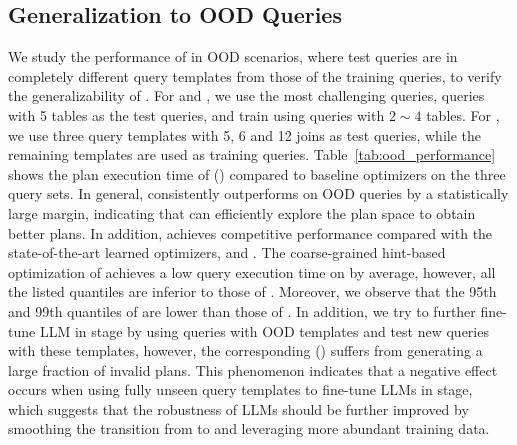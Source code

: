 \subsection{Generalization to OOD Queries}
\label{sec:exp:generalization}
We study the performance of \LLMQO in OOD scenarios, where test queries are in completely different query templates from those of the training queries, to verify the generalizability of \LLMQO.
For \imdb and \job, we use the most challenging queries, queries with 5 tables as the test queries, and train \LLMQO using queries with $2\sim 4$ tables.
For \dsb, we use three query templates with 5, 6 and 12 joins as test queries, while the remaining templates are used as training queries. 
Table~\ref{tab:ood_performance} shows the plan execution time of \LLMQO (\QIT) compared to baseline optimizers on the three query sets. 
In general, \LLMQO consistently outperforms \Postgres on OOD queries by a statistically large margin, 
indicating that \LLMQO can efficiently explore the plan space to obtain better plans.
In addition, \LLMQO achieves competitive performance compared with the state-of-the-art learned optimizers, \bao and \hybrid.
The coarse-grained hint-based optimization of \bao achieves a low query execution time on \dsb 
by average, however, all the listed quantiles are inferior to those of \LLMQO. Moreover, we observe that the 95th and 99th quantiles of \hybrid are lower than those of \LLMQO.
In addition, we try to further fine-tune LLM in \QDPO stage by using queries with OOD templates and test new queries with these templates, however, the corresponding \LLMQO (\QDPO) suffers from generating a large fraction of invalid plans. 
This phenomenon indicates that a
negative effect occurs when using fully unseen query templates to fine-tune LLMs in \QDPO stage, which suggests that the robustness of LLMs should be further improved by smoothing the transition from \QIT to \QDPO and leveraging more abundant training data.


